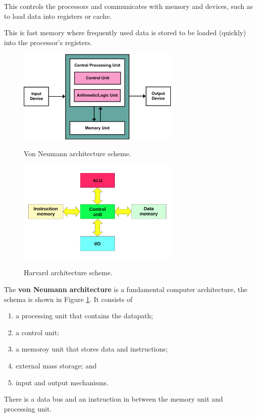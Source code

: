 \begin{definition}[Control]
    This controls the processors and communicates with memory and devices, such as to load data into registers or cache.
\end{definition}

\begin{definition}[Cache]
    This is fast memory where frequently used data is stored to be loaded (quickly) into the processor's registers.
\end{definition}

\begin{figure}
    \centering
    \includegraphics[width = 0.7\textwidth]{images/von_neumann.png}
    \label{fig:von_neumann}
    \caption{Von Neumann architecture scheme.}
\end{figure}

\begin{figure}
    \centering
    \includegraphics[width = 0.7\textwidth]{images/harvard.png}
    \label{fig:harvard}
    \caption{Harvard architecture scheme.}
\end{figure}

\begin{definition}
    \label{def:von_neumann}
    The \textbf{von Neumann architecture} is a fundamental computer architecture, the schema is shown in Figure \ref{fig:von_neumann}. It consists of
    \begin{enumerate}
        \item a processing unit that contains the datapath;
        \item a control unit;
        \item a memoroy unit that stores data and instructions;
        \item external mass storage; and
        \item input and output mechanisms. 
    \end{enumerate}
    There is a data bus and an instruction in between the memory unit and processing unit.
\end{definition}

